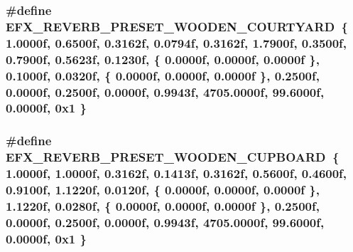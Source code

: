 \subsubsection[{\texorpdfstring{E\+F\+X\+\_\+\+R\+E\+V\+E\+R\+B\+\_\+\+P\+R\+E\+S\+E\+T\+\_\+\+W\+O\+O\+D\+E\+N\+\_\+\+C\+O\+U\+R\+T\+Y\+A\+RD}{EFX_REVERB_PRESET_WOODEN_COURTYARD}}]{\setlength{\rightskip}{0pt plus 5cm}\#define E\+F\+X\+\_\+\+R\+E\+V\+E\+R\+B\+\_\+\+P\+R\+E\+S\+E\+T\+\_\+\+W\+O\+O\+D\+E\+N\+\_\+\+C\+O\+U\+R\+T\+Y\+A\+RD~\{ 1.\+0000f, 0.\+6500f, 0.\+3162f, 0.\+0794f, 0.\+3162f, 1.\+7900f, 0.\+3500f, 0.\+7900f, 0.\+5623f, 0.\+1230f, \{ 0.\+0000f, 0.\+0000f, 0.\+0000f \}, 0.\+1000f, 0.\+0320f, \{ 0.\+0000f, 0.\+0000f, 0.\+0000f \}, 0.\+2500f, 0.\+0000f, 0.\+2500f, 0.\+0000f, 0.\+9943f, 4705.\+0000f, 99.\+6000f, 0.\+0000f, 0x1 \}}\hypertarget{efx-presets_8h_aab1028d9dc70b1bf4f86cf68d8eab1e2}{}\label{efx-presets_8h_aab1028d9dc70b1bf4f86cf68d8eab1e2}
\subsubsection[{\texorpdfstring{E\+F\+X\+\_\+\+R\+E\+V\+E\+R\+B\+\_\+\+P\+R\+E\+S\+E\+T\+\_\+\+W\+O\+O\+D\+E\+N\+\_\+\+C\+U\+P\+B\+O\+A\+RD}{EFX_REVERB_PRESET_WOODEN_CUPBOARD}}]{\setlength{\rightskip}{0pt plus 5cm}\#define E\+F\+X\+\_\+\+R\+E\+V\+E\+R\+B\+\_\+\+P\+R\+E\+S\+E\+T\+\_\+\+W\+O\+O\+D\+E\+N\+\_\+\+C\+U\+P\+B\+O\+A\+RD~\{ 1.\+0000f, 1.\+0000f, 0.\+3162f, 0.\+1413f, 0.\+3162f, 0.\+5600f, 0.\+4600f, 0.\+9100f, 1.\+1220f, 0.\+0120f, \{ 0.\+0000f, 0.\+0000f, 0.\+0000f \}, 1.\+1220f, 0.\+0280f, \{ 0.\+0000f, 0.\+0000f, 0.\+0000f \}, 0.\+2500f, 0.\+0000f, 0.\+2500f, 0.\+0000f, 0.\+9943f, 4705.\+0000f, 99.\+6000f, 0.\+0000f, 0x1 \}}\hypertarget{efx-presets_8h_abdaf8eba9ef400263b72b92ef4d4ab23}{}\label{efx-presets_8h_abdaf8eba9ef400263b72b92ef4d4ab23}
